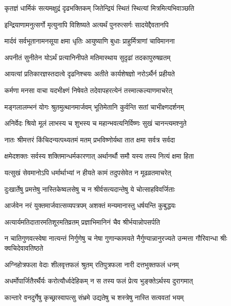 \twolineshloka
{कृतज्ञं धार्मिकं सत्यमक्षुद्रं दृढभक्तिकम्}
{जितेन्द्रियं स्थितं स्थित्यां मित्रमित्यभिवाञ्छति}


\twolineshloka
{इन्द्रियाणामनुत्सर्गो मृत्युनापि विशिष्यते}
{अत्यर्थं पुनरुत्सर्गः सादयेद्दैवतानपि}


\twolineshloka
{मार्दवं सर्वभूतानामनसूया क्षमा धृतिः}
{आयुष्याणि बुधाः प्राहुर्मित्राणां चाविमानना}


\twolineshloka
{अपनीतं सुनीतेन योऽर्थं प्रत्यानिनीपते}
{मतिमास्थाय सुदृढां तदकापुरुषव्रतम्}


\twolineshloka
{आयत्यां प्रतिकारज्ञस्तदात्वे दृढनिश्चयः}
{अतीते कार्यशेषज्ञो नरोऽर्थैर्न प्रहीयते}


\twolineshloka
{कर्मणा मनसा वाचा यदभीक्ष्णं निषेवते}
{तदेवापहरत्येनं तस्मात्कल्याणमाचरेत्}


\twolineshloka
{मङ्गलालम्भनं योगः श्रुतमुत्थानमार्जवम्}
{भूतिमेतानि कुर्वन्ति सतां चाभीक्ष्णदर्शनम्}


\twolineshloka
{अनिर्वेदः श्रियो मूलं लाभस्य च शुभस्य च}
{महान्भवत्यनिर्विष्णः सुखं चानन्त्यमश्नुते}


\twolineshloka
{नातः श्रीमत्तरं किंचिदन्यत्पथ्यतमं मतम्}
{प्रभविष्णोर्यथा तात क्षमा सर्वत्र सर्वदा}


\twolineshloka
{क्षमेदशक्तः सर्वस्य शक्तिमान्धर्मकारणात्}
{अर्थानर्थौ समौ यस्य तस्य नित्यं क्षमा हिता}


\twolineshloka
{यत्सुखं सेवमानोऽपि धर्मार्थाभ्यां न हीयते}
{कामं तदुपसेवेत न मूढव्रतमाचरेत्}


\twolineshloka
{दुःखार्तेषु प्रमत्तेषु नास्तिकेष्वलसेषु च}
{न श्रीर्वसत्यदान्तेषु ये चोत्साहविवर्जिताः}


\twolineshloka
{आर्जवेन नरं युक्तमार्जवात्सव्यपत्रपम्}
{अशक्तं मन्यमानास्तु धर्षयन्ति कुबुद्धयः}


\twolineshloka
{अत्यार्यमतिदातारमतिशूरमतिव्रतम्}
{प्रज्ञाभिमानिनं चैव श्रीर्भयान्नोपसर्पति}


\threelineshloka
{न चातिगुणवत्स्वेषा नात्यन्तं निर्गुणेषु च}
{नेषा गुणान्कामयते नैर्गुण्यान्नानुरज्यते}
{उन्मत्ता गौरिवान्धा श्रीः क्वचिदेवावतिष्ठते}


\twolineshloka
{अग्निहोत्रफला वेदाः शीलवृत्तफलं श्रुतम्}
{रतिपुत्रफला नारी दत्तभुक्तफलं धनम्}


\twolineshloka
{अधर्मोपार्जितैरर्थैर्यः करोत्यौर्ध्वदेहिकम्}
{न स तस्य फलं प्रेत्य भुङ्क्तेऽर्थस्य दुरागमात्}


\twolineshloka
{कान्तारे वनदुर्गेषु कृच्छ्रास्वापत्सु संभ्रमे}
{उद्यतेषु च शस्त्रेषु नास्ति सत्ववतां भयम्}


